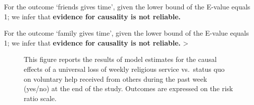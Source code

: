 \documentclass[
  singlecolumn]{article}
\begin{document}
For the outcome `friends gives time', given the lower bound of the
E-value equals 1; we infer that \textbf{evidence for causality is not
reliable.}

For the outcome `family gives time', given the lower bound of the
E-value equals 1; we infer that \textbf{evidence for causality is not
reliable.} \textgreater{}

\newpage{}

\begin{figure}


\caption{\label{fig-3_3}This figure reports the results of model
estimates for the causal effects of a universal loss of weekly religious
service vs.~status quo on voluntary help received from others during the
past week (yes/no) at the end of the study. Outcomes are expressed on
the risk ratio scale.}

\end{figure}%
\end{document}
